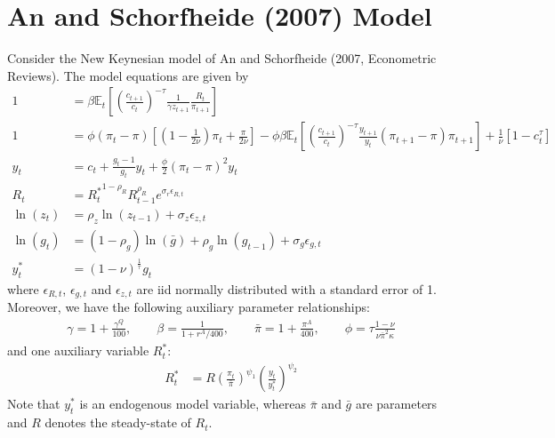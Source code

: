 \documentclass{article}
\begin{document}
\section[An and Schorfheide (2007) Model]{An and Schorfheide (2007) Model\label{ex:AnScho}}
Consider the New Keynesian model of An and Schorfheide (2007, Econometric Reviews).
The model equations are given by 
\begin{align}
	1 &= \beta \mathbb{E}_t\left[\left(\frac{c_{t+1}}{c_t}\right)^{-\tau} \frac{1}{\gamma z_{t+1}} \frac{R_t}{\pi_{t+1}}\right] \label{eq:AS_B1}
  \\
  1 &= \phi \left(\pi_t - \pi\right) \left[\left(1-\frac{1}{2\nu}\right)\pi_t + \frac{\pi}{2\nu}\right] - \phi \beta \mathbb{E}_t \left[\left(\frac{c_{t+1}}{c_t}\right)^{-\tau} \frac{y_{t+1}}{y_t} \left(\pi_{t+1} - \pi \right) \pi_{t+1}\right] + \frac{1}{\nu}\left[1-c_t^{\tau}\right]
  \\
  y_t &= c_t + \frac{g_t-1}{g_t} y_t + \frac{\phi}{2} \left({\pi_t - \pi}\right)^2 y_t
  \\
  R_t &= {R_t^{*}}^{1-\rho_R} R_{t-1}^{\rho_R} e^{\sigma_r\epsilon_{R,t}}
  \\
  \ln(z_t) &= \rho_z \ln(z_{t-1}) + \sigma_z\epsilon_{z,t}
  \\
  \ln(g_t) &= (1-\rho_g)\ln(\bar{g}) + \rho_g \ln(g_{t-1}) + \sigma_g\epsilon_{g,t}
  \\
  y_t^* &= (1-\nu)^{\frac{1}{\tau}} g_t
  \end{align}
where $\epsilon_{R,t}$, $\epsilon_{g,t}$ and $\epsilon_{z,t}$ are iid normally distributed with a standard error of 1.
Moreover, we have the following auxiliary parameter relationships:
\begin{align*}
	  \gamma = 1+\frac{\gamma^{Q}}{100}, \qquad
	  \beta = \frac{1}{1+r^{A}/400}, \qquad
	  \bar{\pi} = 1+\frac{\pi^{A}}{400}, \qquad
	  \phi = \tau \frac{1-\nu}{\nu \bar{\pi}^{2}\kappa}
\end{align*}
and one auxiliary variable $R_t^*$:
\begin{align*}
R_t^* &= R \left(\frac{\pi_t}{\bar{\pi}}\right)^{\psi_1} \left(\frac{y_t}{y_t^*}\right)^{\psi_2}
\end{align*}
Note that $y_t^*$ is an endogenous model variable, whereas $\bar{\pi}$ and $\bar{g}$ are parameters and $R$ denotes the steady-state of $R_t$.
\end{document}
